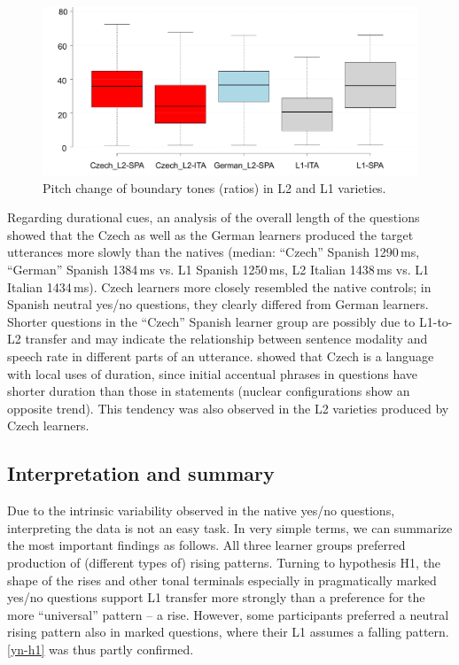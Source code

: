 \begin{figure}
\includegraphics[width=\textwidth]{figures/Figure_90.pdf}
\caption{Pitch change of boundary tones (ratios) in L2 and L1 varieties.}
\label{fig:4.90}
\end{figure}

Regarding durational cues, an analysis of the overall length of the questions showed that the Czech as well as the German learners produced the target utterances more slowly than the natives (median: “Czech” Spanish 1290\,ms, “German” Spanish 1384\,ms vs. L1 Spanish 1250\,ms, L2 Italian 1438\,ms vs. L1 Italian 1434\,ms). Czech learners more closely resembled the native controls; in Spanish neutral yes/no questions, they clearly differed from German learners. Shorter questions in the “Czech” Spanish learner group are possibly due to L1-to-L2 transfer and may indicate the relationship between sentence modality and speech rate in different parts of an utterance. \citet{PeškováEtAl2018} showed that Czech is a language with local uses of duration, since initial accentual phrases in questions have shorter duration than those in statements (nuclear configurations show an opposite trend). This tendency was also observed in the L2 varieties produced by Czech learners.

\subsection{Interpretation and summary}\label{sec:4.3.5}

Due to the intrinsic variability observed in the native yes/no questions, interpreting the data is not an easy task. In very simple terms, we can summarize the most important findings as follows. All three learner groups preferred production of (different types of) rising patterns. Turning to hypothesis H1, the shape of the rises and other tonal terminals especially in pragmatically marked yes/no questions support L1 transfer more strongly than a preference for the more “universal” pattern -- a rise. However, some participants preferred a neutral rising pattern also in marked questions, where their L1 assumes a falling pattern. \ref{yn-h1} was thus partly confirmed.


